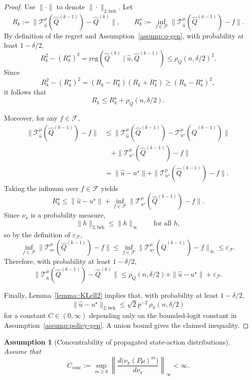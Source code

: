\documentclass{article}
\newtheorem{assumption}{Assumption}
\newcommand{\1}{\mathbbm{1}}
\begin{document}
\begin{proof}
Use \(\|\cdot\|\) to denote \(\|\cdot\|_{2,\mathrm{beh}}\). Let
\[
R_k
:=
\|\mathcal T_{\hat u}^\mu(\hat Q^{(k-1)})-\hat Q^{(k)}\|,
\qquad
R_k^\star
:=
\inf_{f\in\mathcal F}
\|\mathcal T_{\hat u}^\mu(\hat Q^{(k-1)})-f\|.
\]
By definition of the regret and Assumption~\ref{assump:q-gen}, with probability
at least \(1-\delta/2\),
\[
R_k^2-(R_k^\star)^2
=
\mathrm{reg}(\hat Q^{(k)}\mid \hat u,\hat Q^{(k-1)})
\le
\rho_{Q}(n,\delta/2)^2.
\]
Since
\[
R_k^2-(R_k^\star)^2=(R_k-R_k^\star)(R_k+R_k^\star)\ge (R_k-R_k^\star)^2,
\]
it follows that
\[
R_k
\le
R_k^\star+\rho_{Q}(n,\delta/2).
\]

Moreover, for any \(f\in\mathcal F\),
\begin{align*}
\|\mathcal T_{\hat u}^\mu(\hat Q^{(k-1)})-f\|
&\le
\|\mathcal T_{\hat u}^\mu(\hat Q^{(k-1)})
-\mathcal T_{u^\star}^\mu(\hat Q^{(k-1)})\| \\
&\quad+
\|\mathcal T_{u^\star}^\mu(\hat Q^{(k-1)})-f\| \\
&=
\|\hat u-u^\star\|
+
\|\mathcal T_{u^\star}^\mu(\hat Q^{(k-1)})-f\|.
\end{align*}
Taking the infimum over \(f\in\mathcal F\) yields
\[
R_k^\star
\le
\|\hat u-u^\star\|
+
\inf_{f\in\mathcal F}
\|\mathcal T_{u^\star}^\mu(\hat Q^{(k-1)})-f\|.
\]
Since \(\nu_\pi\) is a probability measure,
\[
\|h\|_{2,\mathrm{beh}}\le \|h\|_\infty
\qquad\text{for all }h,
\]
so by the definition of \(\varepsilon_{\mathcal F}\),
\[
\inf_{f\in\mathcal F}
\|\mathcal T_{u^\star}^\mu(\hat Q^{(k-1)})-f\|
\le
\inf_{f\in\mathcal F}
\|\mathcal T_{u^\star}^\mu(\hat Q^{(k-1)})-f\|_\infty
\le
\varepsilon_{\mathcal F}.
\]
Therefore, with probability at least \(1-\delta/2\),
\[
\|\mathcal T_{\hat u}^\mu(\hat Q^{(k-1)})-\hat Q^{(k)}\|
\le
\rho_{Q}(n,\delta/2)+\|\hat u-u^\star\|+\varepsilon_{\mathcal F}.
\]

Finally, Lemma~\ref{lemma::KLell2} implies that, with probability at least
\(1-\delta/2\),
\[
\|\hat u-u^\star\|_{2,\mathrm{beh}}
\le
\sqrt{2}\underline p^{-2}\,\rho_\pi(n,\delta/2)
\]
for a constant \(C \in (0,\infty)\) depending only on the bounded-logit
constant in Assumption~\ref{assump:policy-gen}. A union bound gives the
claimed inequality.
\end{proof}

\begin{assumption}[Concentrability of propagated state-action distributions]
\label{assump:fqe-conc}
Assume that
\[
C_{\mathrm{conc}}
:=
\sup_{m\ge 0}
\left\|
\frac{d\bigl(\nu_\pi (P\mu)^m\bigr)}{d\nu_\pi}
\right\|_\infty
< \infty.
\]
\end{assumption}
\end{document}
